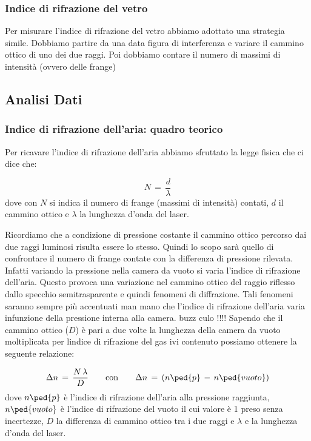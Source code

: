 \subsubsection{Indice di rifrazione del vetro}

Per misurare l'indice di rifrazione del vetro abbiamo adottato una strategia simile. Dobbiamo partire da una data figura di interferenza e variare il cammino ottico di uno dei due raggi. Poi dobbiamo contare il numero di massimi di intensità (ovvero delle frange)

\subsection{Analisi Dati}

\subsubsection{Indice di rifrazione dell'aria: quadro teorico}

Per ricavare l'indice di rifrazione dell'aria abbiamo sfruttato la legge fisica che ci dice che:

\begin{equation}
	N \,=\, \frac{d}{\lambda}
\end{equation}
%
dove con $N$  si indica il numero di frange (massimi di intensità) contati, $d$ il cammino ottico e $\lambda$ la lunghezza d'onda del laser.

Ricordiamo che a condizione di pressione costante il cammino ottico percorso dai due raggi luminosi risulta essere lo stesso.
Quindi lo scopo sarà quello di confrontare il numero di frange contate con la differenza di pressione rilevata. Infatti variando la pressione nella camera da vuoto si varia l'indice di rifrazione dell'aria. Questo provoca una variazione nel cammino ottico del raggio riflesso dallo specchio semitrasparente e quindi fenomeni di diffrazione. Tali fenomeni saranno sempre più accentuati man mano che l'indice di rifrazione dell'aria varia infunzione della pressione interna alla camera. buzz culo !!!!
Sapendo che il cammino ottico ($D$) è pari a due volte la lunghezza della camera da vuoto moltiplicata per lindice di rifrazione del gas ivi contenuto possiamo ottenere la seguente relazione:

\begin{equation}
	\Delta{n} \,=\, \frac{N \, \lambda}{D} \qquad \text{con} \qquad \Delta{n} \,=\, (n\ped{p} \,-\, n\ped{vuoto})
	\label{eq:delta_n}
\end{equation}
%
dove $n\ped{p}$ è l'indice di rifrazione dell'aria alla pressione raggiunta, $n\ped{vuoto}$ è l'indice di rifrazione del vuoto il cui valore è 1 preso senza incertezze, $D$ la differenza di cammino ottico tra i due raggi e $\lambda$ e la lunghezza d'onda del laser.

